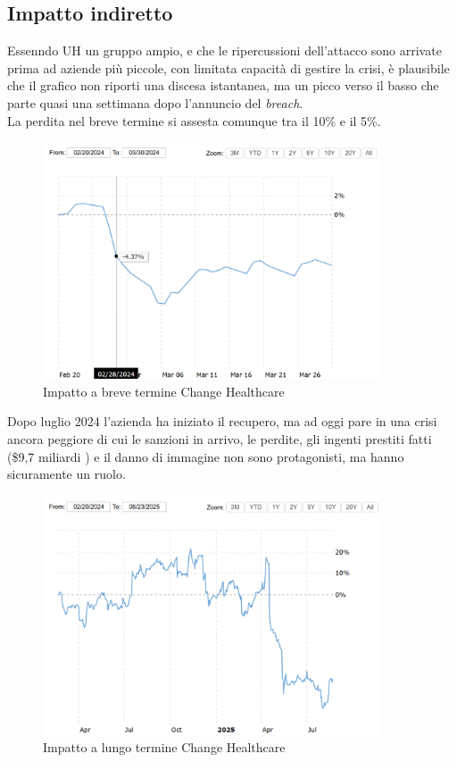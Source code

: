 \documentclass[12pt,a4paper,openright,twoside]{report}
\begin{document}
\subsection{Impatto indiretto}
Essenndo UH un gruppo ampio, e che le ripercussioni dell'attacco sono arrivate prima ad aziende pi\`u piccole, con limitata capacit\`a di gestire la crisi, \`e plausibile che il grafico non riporti una discesa istantanea, ma un picco verso il basso che parte quasi una settimana dopo l'annuncio del \textit{breach}.\\
La perdita nel breve termine si assesta comunque tra il 10\% e il 5\%.\\
\begin{figure}[H] 
\begin{center} 
\includegraphics[width=10cm]{figures/chHealth_short.png} 
\caption[Grafico Change Healthcare short]{Impatto a breve termine Change Healthcare}\label{fig:chh1}
\end{center}
\end{figure}

Dopo luglio 2024 l'azienda ha iniziato il recupero, ma ad oggi pare in una crisi ancora peggiore di cui le sanzioni in arrivo, le perdite, gli ingenti prestiti fatti (\$9,7 miliardi \cite{ChHealth_lessons}) e il danno di immagine non sono protagonisti, ma hanno sicuramente un ruolo.\\

\begin{figure}[H] 
\begin{center} 
\includegraphics[width=10cm]{figures/chHealth_long.png} 
\caption[Grafico Change Healthcare long]{Impatto a lungo termine  Change Healthcare}\label{fig:chh2}
\end{center}
\end{figure}
\end{document}
